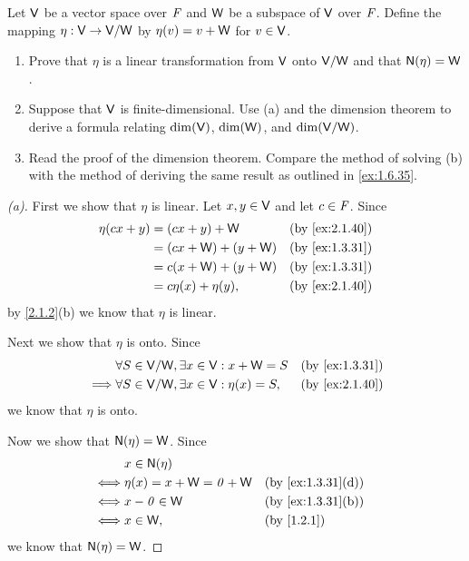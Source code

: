 \begin{ex}\label{ex:2.1.40}
  Let \(\mathsf{V}\) be a vector space over \(\mathit{F}\) and \(\mathsf{W}\) be a subspace of \(\mathsf{V}\) over \(\mathit{F}\).
  Define the mapping \(\eta : \mathsf{V} \to \mathsf{V} / \mathsf{W}\) by \(\eta(v) = v + \mathsf{W}\) for \(v \in \mathsf{V}\).
  \begin{enumerate}
    \item Prove that \(\eta\) is a linear transformation from \(\mathsf{V}\) onto \(\mathsf{V} / \mathsf{W}\) and that \(\ns{\eta} = \W\).
    \item Suppose that \(\mathsf{V}\) is finite-dimensional.
          Use (a) and the dimension theorem to derive a formula relating \(\dim(\mathsf{V})\), \(\dim(\mathsf{W})\), and \(\dim(\mathsf{V} / \mathsf{W})\).
    \item Read the proof of the dimension theorem.
          Compare the method of solving (b) with the method of deriving the same result as outlined in \cref{ex:1.6.35}.
  \end{enumerate}
\end{ex}

\begin{proof}[(a)]
  First we show that \(\eta\) is linear.
  Let \(x, y \in \mathsf{V}\) and let \(c \in \mathit{F}\).
  Since
  \begin{align*}
    \eta(cx + y) & = (cx + y) + \W         &  & \text{(by \cref{ex:2.1.40})} \\
                 & = (cx + \W) + (y + \W)  &  & \text{(by \cref{ex:1.3.31})} \\
                 & = c (x + \W) + (y + \W) &  & \text{(by \cref{ex:1.3.31})} \\
                 & = c \eta(x) + \eta(y),  &  & \text{(by \cref{ex:2.1.40})}
  \end{align*}
  by \cref{2.1.2}(b) we know that \(\eta\) is linear.

  Next we show that \(\eta\) is onto.
  Since
  \begin{align*}
             & \forall S \in \V / \W, \exists x \in \V : x + \W = S   &  & \text{(by \cref{ex:1.3.31})} \\
    \implies & \forall S \in \V / \W, \exists x \in \V : \eta(x) = S, &  & \text{(by \cref{ex:2.1.40})}
  \end{align*}
  we know that \(\eta\) is onto.

  Now we show that \(\ns{\eta} = \W\).
  Since
  \begin{align*}
         & x \in \ns{\eta}                                                  \\
    \iff & \eta(x) = x + \W = \zv + \W &  & \text{(by \cref{ex:1.3.31}(d))} \\
    \iff & x - \zv \in \W              &  & \text{(by \cref{ex:1.3.31}(b))} \\
    \iff & x \in \W,                   &  & \text{(by \cref{1.2.1})}
  \end{align*}
  we know that \(\ns{\eta} = \W\).
\end{proof}

